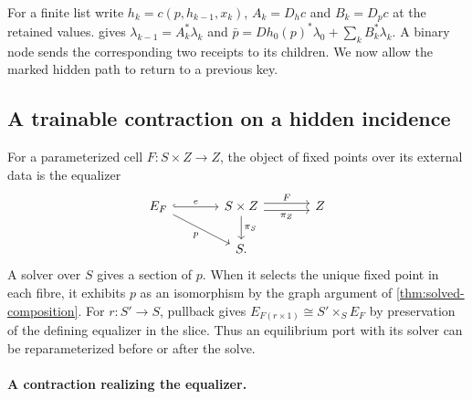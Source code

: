 \documentclass[11pt,a4paper]{article}
\theoremstyle{definition}
\theoremstyle{remark}\newaliascnt{remark}{theorem}
\numberwithin{equation}{section}
\begin{document}
For a finite list write $h_k=c(p,h_{k-1},x_k)$, $A_k=D_hc$ and $B_k=D_pc$ at the retained values.  gives $\lambda_{k-1}=A_k^*\lambda_k$ and $\bar p=Dh_0(p)^*\lambda_0+\sum_k B_k^*\lambda_k$. A binary node sends the corresponding two receipts to its children. We now allow the marked hidden path to return to a previous key.

\subsection{A trainable contraction on a hidden incidence}

For a parameterized cell \(F:S\times Z\to Z\), the object of fixed points over its external data is the equalizer
\[
\begin{tikzcd}[column sep=large]
 E_F\arrow[r,hook,"e"]\arrow[dr,"p"']&S\times Z\arrow[r,shift left=.65ex,"F"]\arrow[r,shift right=.65ex,"\pi_Z"']\arrow[d,"\pi_S"]&Z\\
 &S .
\end{tikzcd}
\]
A solver over \(S\) gives a section of \(p\). When it selects the unique fixed point in each fibre, it exhibits \(p\) as an isomorphism by the graph argument of \cref{thm:solved-composition}. For \(r:S'\to S\), pullback gives \(E_{F(r\times1)}\cong S'\times_S E_F\) by preservation of the defining equalizer in the slice. Thus an equilibrium port with its solver can be reparameterized before or after the solve.

\paragraph{A contraction realizing the equalizer.}
\end{document}
